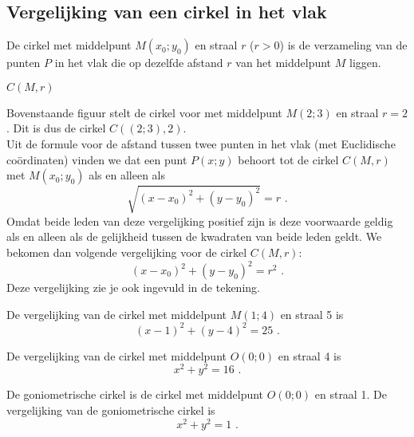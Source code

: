 
\subsection{Vergelijking van een cirkel in het vlak}
\noindent

\begin{definitie}
	De cirkel met middelpunt $M(x_0;y_0)$ en straal $r$ ($r>0$) is de verzameling van de punten $P$ in het vlak die op dezelfde afstand $r$ van het middelpunt $M$ liggen.
\end{definitie}

\begin{notatie}
	$C(M,r)$
\end{notatie}

\begin{center}
	
\end{center}



Bovenstaande figuur stelt de cirkel voor met middelpunt $M(2;3)$ en straal $r=2$.
Dit is dus de cirkel $C((2;3),2)$.\\

Uit de formule voor de afstand tussen twee punten in het vlak (met Euclidische co\"ordinaten) vinden we dat een punt $P(x;y)$ behoort tot de cirkel $C(M,r)$ met $M(x_0;y_0)$ als en alleen als
\[
\sqrt {(x-x_0)^2+(y-y_0)^2}=r \text { .}
\]
Omdat beide leden van deze vergelijking positief zijn is deze voorwaarde geldig als en alleen als de gelijkheid tussen de kwadraten van beide leden geldt.
We bekomen dan volgende vergelijking voor de cirkel $C(M,r)$:
\[
(x-x_0)^2+(y-y_0)^2=r^2 \text { .}
\]
Deze vergelijking zie je ook ingevuld in de tekening.

\begin{voorbeeld}
	De vergelijking van de cirkel met middelpunt $M(1;4)$ en straal 5 is
\[
(x-1)^2+(y-4)^2=25 \text { .}
\]
\end{voorbeeld}
\begin{voorbeeld}
	De vergelijking van de cirkel met middelpunt $O(0;0)$ en straal 4 is
\[
x^2+y^2=16 \text { .}
\]
\end{voorbeeld}
\begin{voorbeeld}
	De goniometrische cirkel is de cirkel met middelpunt $O(0;0)$ en straal 1.
De vergelijking van de goniometrische cirkel is
\[
x^2+y^2=1 \text { .}
\]

\end{voorbeeld}

